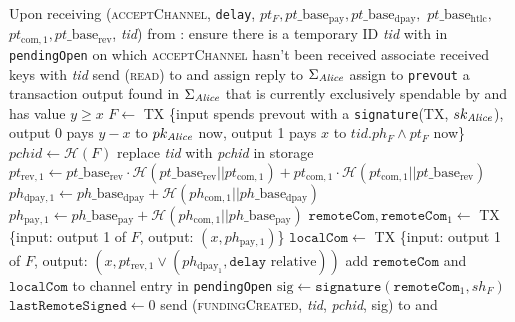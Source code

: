 \begin{algorithmic}[1]
    \State Upon receiving (\textsc{acceptChannel}, \texttt{delay}, $pt_F,
    pt\_\mathrm{base}_{\mathrm{pay}}, pt\_\mathrm{base}_{\mathrm{dpay}},$
    $pt\_\mathrm{base}_{\mathrm{htlc}},$ $pt_{\mathrm{com}, 1},
    pt\_\mathrm{base}_{\mathrm{rev}}$, \textit{tid}) from \bob:
    \Indent
      \State ensure there is a temporary ID \textit{tid} with \bob{} in
      \texttt{pendingOpen} on which \textsc{acceptChannel} hasn't been received
      \State associate received keys with \textit{tid}
      \State send (\textsc{read}) to \ledger{} and assign reply to
      $\Sigma_{\mathit{Alice}}$
      \State assign to \texttt{prevout} a transaction output found in
      $\Sigma_{\mathit{Alice}}$ that is currently exclusively spendable by \alice{} and
      has value $y \geq x$
      \State $F \gets$ TX \{input spends prevout with a \texttt{signature}(TX,
      $sk_{\mathit{Alice}}$), output 0 pays $y - x$ to $pk_{\mathit{Alice}}$ now, output 1 pays
      $x$ to $\textit{tid}.ph_F \wedge pt_F$ now\}
      \State $\mathit{pchid} \gets \mathcal{H}\left(F\right)$
      \State replace \textit{tid} with \textit{pchid} in storage
      \State $pt_{\mathrm{rev}, 1} \gets pt\_\mathrm{base}_{\mathrm{rev}} \cdot
      \mathcal{H}\left(pt\_\mathrm{base}_{\mathrm{rev}} ||
      pt_{\mathrm{com}, 1}\right) + pt_{\mathrm{com}, 1} \cdot \mathcal{H}\left(
      pt_{\mathrm{com}, 1} || pt\_\mathrm{base}_{\mathrm{rev}}\right)$
      \State $ph_{\mathrm{dpay}, 1} \gets ph\_\mathrm{base}_{\mathrm{dpay}} +
      \mathcal{H}\left(ph_{\mathrm{com}, 1} ||
      ph\_\mathrm{base}_{\mathrm{dpay}}\right)$
      \State $ph_{\mathrm{pay}, 1} \gets ph\_\mathrm{base}_{\mathrm{pay}} +
      \mathcal{H}\left(ph_{\mathrm{com}, 1} ||
      ph\_\mathrm{base}_{\mathrm{pay}}\right)$
      \State $\mathtt{remoteCom}, \mathtt{remoteCom}_1 \gets$ TX \{input: output
      1 of $F$, output: $\left(x, ph_{\mathrm{pay}, 1}\right)$\}
      \State $\mathtt{localCom} \gets$ TX \{input: output 1 of $F$, output:
      $\left(x, pt_{\mathrm{rev}, 1} \vee \left(ph_{\mathrm{dpay}_1},
      \mathtt{delay} \text{ relative}\right)\right)$ 
      \State add $\mathtt{remoteCom}$ and $\mathtt{localCom}$ to channel entry
      in \texttt{pendingOpen}
      \State $\mathrm{sig} \gets \mathtt{signature}\left(\mathtt{remoteCom}_1,
      sh_F\right)$
      \State $\mathtt{lastRemoteSigned} \gets 0$
      \State send (\textsc{fundingCreated}, \textit{tid},
      \textit{pchid}, sig) to \bob{} and \adversary
    \EndIndent
    \State


\end{algorithmic}
